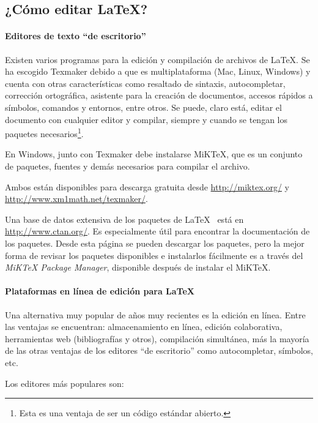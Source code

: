 \documentclass[12pt,letterpaper]{article}
\begin{document}
\subsection{¿Cómo editar \LaTeX?}\label{S:programas}

\paragraph{Editores de texto ``de escritorio''}

Existen varios programas para la edición y compilación de archivos de \LaTeX. Se ha escogido Texmaker debido a que es multiplataforma (Mac, Linux, Windows) y cuenta con otras características como resaltado de sintaxis, autocompletar, corrección ortográfica, asistente para la creación de documentos, accesos rápidos a símbolos, comandos y entornos, entre otros. Se puede, claro está, editar el documento con cualquier editor y compilar, siempre y cuando se tengan los paquetes necesarios\footnote{Esta es una ventaja de ser un código estándar abierto.}.

En Windows, junto con Texmaker debe instalarse MiKTeX, que es un conjunto de paquetes, fuentes y demás necesarios para compilar el archivo.

Ambos están disponibles para descarga gratuita desde \url{http://miktex.org/} y \url{http://www.xm1math.net/texmaker/}.

Una base de datos extensiva de los paquetes de \LaTeX~ está en \url{http://www.ctan.org/}. Es especialmente útil para encontrar la documentación de los paquetes. Desde esta página se pueden descargar los paquetes, pero la mejor forma de revisar los paquetes disponibles e instalarlos fácilmente es a través del \emph{MiKTeX Package Manager}, disponible después de instalar el MiKTeX.

\paragraph{Plataformas en línea de edición para \LaTeX}

Una alternativa muy popular de años muy recientes es la edición en línea. Entre las ventajas se encuentran: almacenamiento en línea, edición colaborativa, herramientas web (bibliografías y otros), compilación simultánea, más la mayoría de las otras ventajas de los editores ``de escritorio'' como autocompletar, símbolos, etc.

Los editores más populares son:
\end{document}
